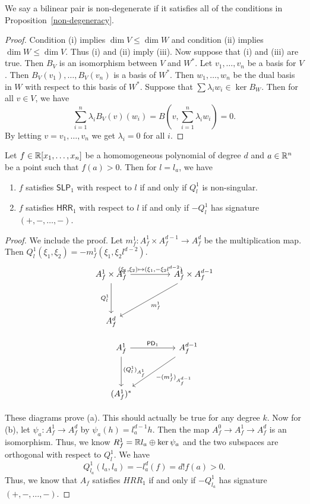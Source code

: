 \documentclass[12pt]{article}
\begin{document}
We say a bilinear pair is non-degenerate if it satisfies all of the conditions in Proposition~\ref{non-degeneracy}. 
\begin{proof}
	Condition (i) implies $\dim V \leq \dim W$ and condition (ii) implies $\dim W \leq \dim V$. Thus (i) and (ii) imply (iii). Now suppose that (i) and (iii) are true. Then $B_V$ is an isomorphism between $V$ and $W^*$. Let $v_1, \ldots, v_n$ be a basis for $V$. Then $B_V(v_1), \ldots, B_V(v_n)$ is a basis of $W^*$. Then $w_1, \ldots, w_n$ be the dual basis in $W$ with respect to this basis of $W^*$. Suppose that $\sum \lambda_i w_i \in \ker B_W$. Then for all $v \in V$, we have
	\[
		\sum_{i = 1}^n \lambda_i B_V(v)(w_i) = B \left (v, \sum_{i = 1}^n \lambda_i w_i \right ) = 0.
	\]
	By letting $v = v_1, \ldots, v_n$ we get $\lambda_i = 0$ for all $i$. 
\end{proof}

\begin{lem} 
	Let $f \in \mathbb{R} [x_1, \ldots, x_n]$ be a homomogeneous polynomial of degree $d$ and $a \in \mathbb{R}^n$ be a point such that $f(a) > 0$. Then for $l= l_a$, we have
	\begin{enumerate}[label = (\alph*)]
		\item $f$ satisfies $\mathsf{SLP}_1$ with respect to $l$ if and only if $Q_l^1$ is non-singular. 
		\item $f$ satisfies $\mathsf{HRR}_1$ with respect to $l$ if and only if $-Q_l^1$ has signature $(+, -, \ldots, -)$. 
	\end{enumerate}
\end{lem}

\begin{proof}
	We include the proof. Let $m_f^1 : A_f^1 \times A_f^{d-1} \to A_f^d$ be the multiplication map. Then $Q_l^1 (\xi_1, \xi_2) = - m_f^1(\xi_1, \xi_2 l^{d-2})$. 
	\[\begin{tikzcd}
	{A_f^1 \times A_f^1} && {A_f^1 \times A_f^{d-1}} \\
	\\
	{A_f^d}
	\arrow["{Q_l^1}"', from=1-1, to=3-1]
	\arrow["{(\xi_1, \xi_2) \mapsto (\xi_1, - \xi_2 l^{d-2})}", from=1-1, to=1-3]
	\arrow["{m_f^1}", from=1-3, to=3-1]
\end{tikzcd}\]

\[\begin{tikzcd}
	{A_f^1} && {A_f^{d-1}} \\
	\\
	{(A_f^1)^*}
	\arrow["{(Q_l^1)_{A_f^1}}", from=1-1, to=3-1]
	\arrow["{\mathsf{PD}_1}", from=1-1, to=1-3]
	\arrow["{-(m_f^1)_{A_f^{d-1}}}", from=1-3, to=3-1]
\end{tikzcd}\]

These diagrams prove (a). This should actually be true for any degree $k$. Now for (b), let $\psi_a : A_f^1 \to A_f^d$ by $\psi_a(h) = l_a^{d-1}h$. Then the map $A_f^0 \to A_f^1 \to A_f^d$ is an isomorphism. Thus, we know $R_f^1 = \mathbb{R} l_a \oplus \ker \psi_a$ and the two subspaces are orthogonal with respect to $Q_l^1$. We have 
\[
	Q_{l_a}^1(l_a, l_a) = - l_a^d (f) = d! f(a) > 0.
\]
Thus, we know that $A_f$ satisfies $HRR_1$ if and only if $-Q_{l_a}^1$ has signature $(+, -, \ldots, -)$. 
\end{proof}
\end{document}
